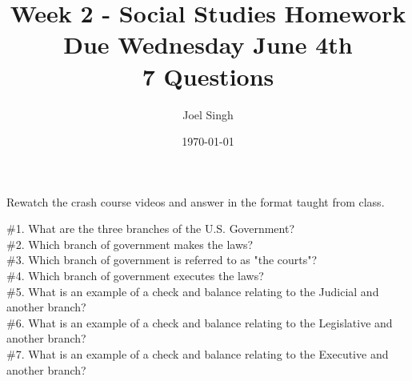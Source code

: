 \documentclass{article}
\title{Week 2 - Social Studies Homework \\ Due Wednesday June 4th \\ 7 Questions}
\author{Joel Singh}
\date{\today}
\begin{document}
\maketitle

Rewatch the crash course videos and answer in the format taught from class.

\#1. What are the three branches of the U.S. Government? \vspace{2in} \\

\#2. Which branch of government makes the laws? \vspace{2in} \\

\#3. Which branch of government is referred to as "the courts"? \vspace{2in} \\

\#4. Which branch of government executes the laws? \vspace{2in} \\

\#5. What is an example of a check and balance relating to the Judicial and another branch? \vspace{2in} \\

\#6. What is an example of a check and balance relating to the Legislative and another branch? \vspace{2in} \\

\#7. What is an example of a check and balance relating to the Executive and another branch? \vspace{2in} \\
\end{document}
